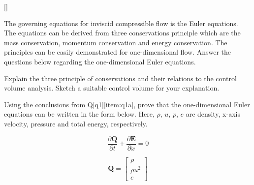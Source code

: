 
%




\question{}[\label{q1}]

The governing equations for inviscid compressible flow is the Euler equations. The equations can be derived from three conservations principle which are the mass conservation, momentum conservation and energy conservation. The principles can be easily demonstrated for one-dimensional flow. Answer the questions below regarding the one-dimensional Euler equations.

\listbeginx	%
	\item \label{item:q1a} Explain the three principle of conservations and their relations to the control volume analysis. Sketch a suitable control volume for your explanation.
	

	
	\item \label{item:q1b} Using the conclusions from Q\ref{q1}\ref{item:q1a}, prove that the one-dimensional Euler equations can be written in the form below. Here, $\rho$, $u$, $p$, $e$ are density, x-axis velocity, pressure and total energy, respectively.
		
	
	\begin{equation}
	\frac{\partial \textbf{Q} }{\partial t} + \frac{\partial \textbf{E}}{\partial x} = 0 \nonumber
	\end{equation}
	
	\begin{equation}
	\textbf{Q} = \begin{bmatrix}
	\rho \\ \rho u^2 \\ e
	\end{bmatrix}    \nonumber
\end{equation}

